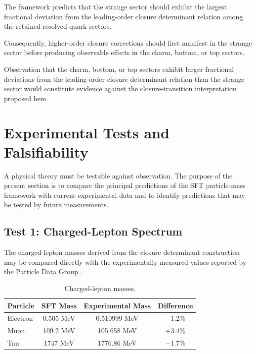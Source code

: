 \documentclass[11pt]{article}
\theoremstyle{definition}
\theoremstyle{remark}
\begin{document}
The framework predicts that the strange sector should exhibit
the largest fractional deviation from the leading-order closure
determinant relation among the retained resolved quark sectors.

Consequently, higher-order closure corrections should first
manifest in the strange sector before producing observable
effects in the charm, bottom, or top sectors.

Observation that the charm, bottom, or top sectors exhibit
larger fractional deviations from the leading-order closure
determinant relation than the strange sector would constitute
evidence against the closure-transition interpretation proposed
here.



\section{Experimental Tests and Falsifiability}
\label{sec:experimental_tests}

A physical theory must be testable against observation.
The purpose of the present section is to compare the principal
predictions of the SFT particle-mass framework with current
experimental data and to identify predictions that may be
tested by future measurements.


\subsection{Test 1: Charged-Lepton Spectrum}

The charged-lepton masses derived from the closure determinant
construction may be compared directly with the experimentally
measured values reported by the Particle Data Group
\cite{PDG2024}.

\begin{table}[H]
\centering
\caption{Charged-lepton masses.}
\begin{tabular}{lccc}
\toprule
Particle &
SFT Mass &
Experimental Mass &
Difference \\
\midrule
Electron &
0.505 MeV &
0.510999 MeV &
$-1.2\%$ \\
Muon &
109.2 MeV &
105.658 MeV &
$+3.4\%$ \\
Tau &
1747 MeV &
1776.86 MeV &
$-1.7\%$ \\
\bottomrule
\end{tabular}
\end{table}
\end{document}
